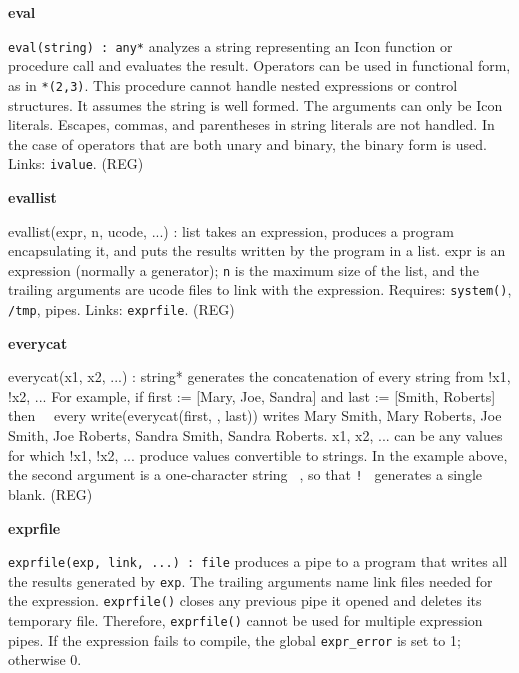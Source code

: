 {\sffamily\bfseries
eval}

\texttt{eval(string) : any*} analyzes a string
representing an Icon function or procedure call and evaluates the
result. Operators can be used in functional form, as in
\texttt{{\textquotedbl}*(2,3){\textquotedbl}}. This procedure cannot
handle nested expressions or control structures. It assumes the string
is well formed. The arguments can only be Icon literals. Escapes,
commas, and parentheses in string literals are not handled. In the case
of operators that are both unary and binary, the binary form is used.
Links: \texttt{ivalue}. (REG)

{\sffamily\bfseries
evallist}

\textsf{evallist(expr, n, ucode, ...) : list} takes an expression,
produces a program encapsulating it, and puts the results written by
the program in a list. \textsf{expr} is an expression (normally a
generator); \texttt{n} is the maximum size of the list, and the
trailing arguments are ucode files to link with the expression.
Requires: \texttt{system()}, \texttt{/tmp}, pipes. Links:
\texttt{exprfile}. (REG)

{\sffamily\bfseries
everycat}

\textsf{everycat(x1, x2, ...) : string*} generates the concatenation of
every string from !x1, !x2, ... For example, if first :=
[{\textquotedbl}Mary{\textquotedbl}, {\textquotedbl}Joe{\textquotedbl},
{\textquotedbl}Sandra{\textquotedbl}] and last :=
[{\textquotedbl}Smith{\textquotedbl},
{\textquotedbl}Roberts{\textquotedbl}] then \ \ every
write(everycat(first, {\textquotedbl} {\textquotedbl}, last)) writes
Mary Smith, Mary Roberts, Joe Smith, Joe Roberts, Sandra Smith, Sandra
Roberts. x1, x2, ... can be any values for which !x1, !x2, ... produce
values convertible to strings. In the example above, the second
argument is a one-character string \texttt{{\textquotedbl}
{\textquotedbl}}, so that \texttt{!{\textquotedbl} {\textquotedbl}}
generates a single blank. (REG)

{\sffamily\bfseries
exprfile}

\texttt{exprfile(exp, link, ...) : file} produces a pipe to a program
that writes all the results generated by \texttt{exp}. The trailing
arguments name link files needed for the expression.
\texttt{exprfile()} closes any previous pipe it opened and deletes its
temporary file. Therefore, \texttt{exprfile()} cannot be used for
multiple expression pipes. If the expression fails to compile, the
global \texttt{expr\_error} is set to 1; otherwise 0. 

